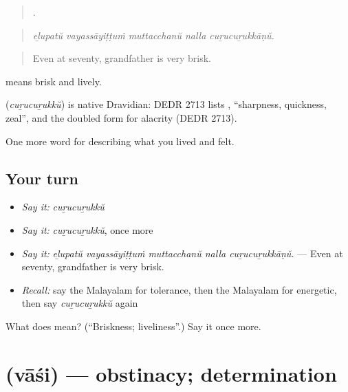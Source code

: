 \begin{quote}
    .
\end{quote}

\begin{quote}
\emph{eḻupatŭ vayassāyiṭṭuṁ muttacchanŭ nalla cuṟucuṟukkāṇŭ.}
\end{quote}

\begin{quote}
Even at seventy, grandfather is very brisk.
\end{quote}

 means brisk and lively.

\begin{cousinweb}
\textbf{} (\emph{cuṟucuṟukkŭ}) is native Dravidian: DEDR 2713 lists , \textquotedblleft{}sharpness, quickness, zeal\textquotedblright{}, and the doubled form for alacrity (DEDR 2713).
\end{cousinweb}

\begin{grammarlens}[title={What you've built}]
One more word for describing what you lived and felt.
\end{grammarlens}

\subsection*{Your turn}
\begin{itemize}
\raggedright
  \item \emph{Say it:} \emph{cuṟucuṟukkŭ}
  \item \emph{Say it:} \emph{cuṟucuṟukkŭ}, once more
  \item \emph{Say it:} \emph{eḻupatŭ vayassāyiṭṭuṁ muttacchanŭ nalla cuṟucuṟukkāṇŭ.} — Even at seventy, grandfather is very brisk.
  \item \emph{Recall:} say the Malayalam for tolerance, then the Malayalam for energetic, then say \emph{cuṟucuṟukkŭ} again
\end{itemize}

\begin{tcolorbox}[breakable,colback=teal!4,colframe=teal!35!black,title={Before you move on}]
What does  mean? (\textquotedblleft{}Briskness; liveliness\textquotedblright{}.) Say it once more.
\end{tcolorbox}
\section[\texorpdfstring{\ml{വാശി} (vāśi)}{വാശി (vāśi)}]{ (vāśi) — obstinacy; determination}

